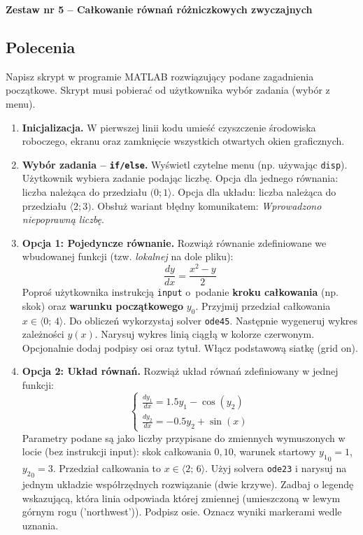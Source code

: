 \documentclass[a4paper,11pt]{article}
\begin{document}
\clearpage
\begin{center}
  {\large\bfseries Zestaw nr 5 \quad -- \quad Całkowanie równań różniczkowych zwyczajnych}
\end{center}
\hrulefill
\vspace{0.4cm}

\subsection*{Polecenia}

Napisz skrypt w programie MATLAB rozwiązujący podane zagadnienia początkowe. Skrypt musi pobierać od użytkownika wybór zadania (wybór z menu).

\begin{enumerate}[leftmargin=*, label=\textbf{\arabic*.}, itemsep=2pt]

  \item \textbf{Inicjalizacja.}
    W pierwszej linii kodu umieść czyszczenie środowiska roboczego, ekranu oraz zamknięcie wszystkich otwartych okien graficznych.

  \item \textbf{Wybór zadania -- \texttt{if/else}.}
    Wyświetl czytelne menu (np. używając \texttt{disp}). Użytkownik wybiera zadanie podając liczbę. Opcja dla jednego równania: liczba należąca do przedziału $(0; 1\rangle$. Opcja dla układu: liczba należąca do przedziału $\langle 2; 3)$. Obsłuż wariant błędny komunikatem: \textit{Wprowadzono niepoprawną liczbę}.

  \item \textbf{Opcja 1: Pojedyncze równanie.}
    Rozwiąż równanie zdefiniowane we wbudowanej funkcji (tzw. \textit{lokalnej} na dole pliku):
    \[ \frac{dy}{dx} = \frac{x^2 - y}{2} \]
    Poproś użytkownika instrukcją \texttt{input} o~podanie \textbf{kroku całkowania} (np. skok) oraz \textbf{warunku początkowego} $y_0$. Przyjmij przedział całkowania $x \in \langle 0;\,4 \rangle$.
    Do obliczeń wykorzystaj solver \texttt{ode45}. Następnie wygeneruj wykres zależności $y(x)$. Narysuj wykres linią ciągłą w kolorze czerwonym. Opcjonalnie dodaj podpisy osi oraz tytuł. Włącz podstawową siatkę (grid on).

  \item \textbf{Opcja 2: Układ równań.}
    Rozwiąż układ równań zdefiniowany w jednej funkcji:\\[-0.5em]
    \[
    \begin{cases}
      \frac{dy_1}{dx} = 1.5y_1 - \cos(y_2) \\
      \frac{dy_2}{dx} = -0.5y_2 + \sin(x)
    \end{cases}
    \]
    Parametry podane są jako liczby przypisane do zmiennych wymuszonych w locie (bez instrukcji input): skok całkowania $0{,}10$, warunek startowy $ {y_1}_{0} = 1 $, $ {y_2}_{0} = 3 $. Przedział całkowania to $x \in \langle 2;\,6 \rangle$.
    Użyj solvera \texttt{ode23} i narysuj na jednym układzie współrzędnych rozwiązanie (dwie krzywe). Zadbaj o legendę wskazującą, która linia odpowiada której zmiennej (umieszczoną w lewym górnym rogu ('northwest')). Podpisz osie. Oznacz wyniki markerami wedle uznania.

\end{enumerate}
\end{document}
